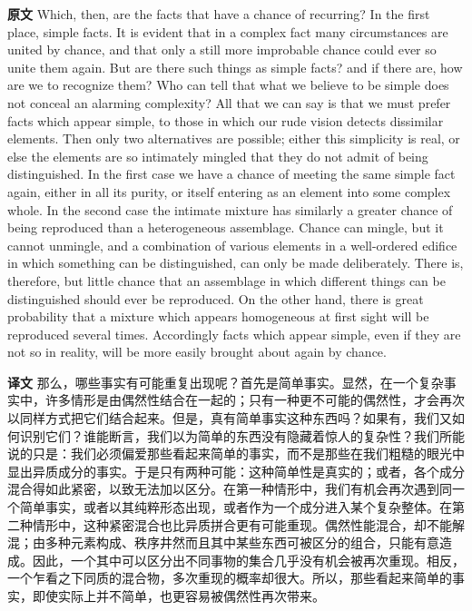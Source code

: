 \documentclass[UTF8,zihao=-4]{ctexart}
\newcommand{\BodyFont}{\fontsize{10.5pt}{15.5pt}\selectfont}
\newcommand{\origlabel}{\textbf{原文}\quad}
\newcommand{\translabel}{\textbf{译文}\quad}
\newenvironment{enblock}{\par\noindent\begingroup\BodyFont\origlabel}{\par\endgroup}
\newenvironment{zhblock}{\par\noindent\begingroup\BodyFont\translabel}{\par\endgroup\vspace{0.35em}}
\begin{document}
\begin{enblock}
Which, then, are the facts that have a chance of recurring? In the first place, simple facts. It is evident that in a complex fact many circumstances are united by chance, and that only a still more improbable chance could ever so unite them again. But are there such things as simple facts? and if there are, how are we to recognize them? Who can tell that what we believe to be simple does not conceal an alarming complexity? All that we can say is that we must prefer facts which appear simple, to those in which our rude vision detects dissimilar elements. Then only two alternatives are possible; either this simplicity is real, or else the elements are so intimately mingled that they do not admit of being distinguished. In the first case we have a chance of meeting the same simple fact again, either in all its purity, or itself entering as an element into some complex whole. In the second case the intimate mixture has similarly a greater chance of being reproduced than a heterogeneous assemblage. Chance can mingle, but it cannot unmingle, and a combination of various elements in a well-ordered edifice in which something can be distinguished, can only be made deliberately. There is, therefore, but little chance that an assemblage in which different things can be distinguished should ever be reproduced. On the other hand, there is great probability that a mixture which appears homogeneous at first sight will be reproduced several times. Accordingly facts which appear simple, even if they are not so in reality, will be more easily brought about again by chance.
\end{enblock}
\begin{zhblock}
那么，哪些事实有可能重复出现呢？首先是简单事实。显然，在一个复杂事实中，许多情形是由偶然性结合在一起的；只有一种更不可能的偶然性，才会再次以同样方式把它们结合起来。但是，真有简单事实这种东西吗？如果有，我们又如何识别它们？谁能断言，我们以为简单的东西没有隐藏着惊人的复杂性？我们所能说的只是：我们必须偏爱那些看起来简单的事实，而不是那些在我们粗糙的眼光中显出异质成分的事实。于是只有两种可能：这种简单性是真实的；或者，各个成分混合得如此紧密，以致无法加以区分。在第一种情形中，我们有机会再次遇到同一个简单事实，或者以其纯粹形态出现，或者作为一个成分进入某个复杂整体。在第二种情形中，这种紧密混合也比异质拼合更有可能重现。偶然性能混合，却不能解混；由多种元素构成、秩序井然而且其中某些东西可被区分的组合，只能有意造成。因此，一个其中可以区分出不同事物的集合几乎没有机会被再次重现。相反，一个乍看之下同质的混合物，多次重现的概率却很大。所以，那些看起来简单的事实，即使实际上并不简单，也更容易被偶然性再次带来。\end{zhblock}
\end{document}
